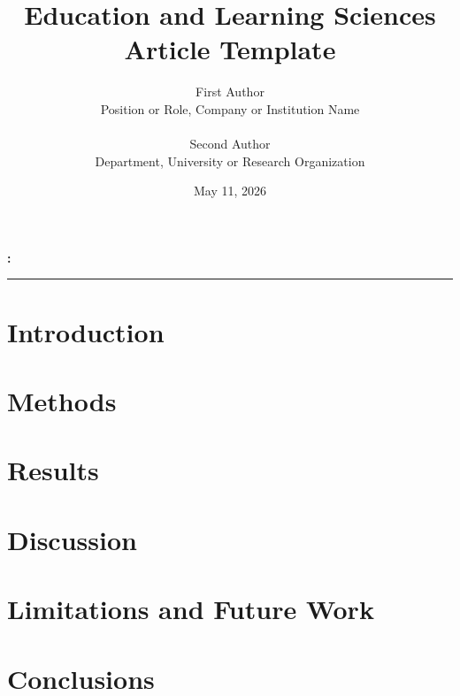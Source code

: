 \documentclass[11pt]{article}
\title{Education and Learning Sciences Article Template}
\author{%
  First Author\hspace{2pt}\orcidicon{0000-0000-0000-0000}\\
  Position or Role, Company or Institution Name\\
  \doiLink{10.5281/zenodo.xxxxxxxx}\\[0.35em]
  Second Author\hspace{2pt}\orcidicon{0000-0000-0000-0000}\\
  Department, University or Research Organization
}
\date{May 11, 2026}
\begin{document}
\maketitle

\begin{abstract}

\end{abstract}

\noindent\textbf{\keywordsname:}\ \rule{0.78\linewidth}{0.4pt}

\newpage
\tableofcontents
\newpage

\section{Introduction}
\label{sec:introduction}


\section{Methods}
\label{sec:methods}


\section{Results}
\label{sec:results}


\section{Discussion}
\label{sec:discussion}


\section{Limitations and Future Work}
\label{sec:limitations}


\section{Conclusions}
\label{sec:conclusions}


{}




\end{document}
